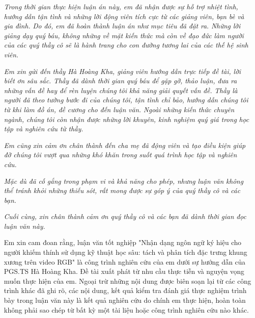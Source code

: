 

\newpage
{}
\thispagestyle{loi_cam_on}
\begin{center}
{}
\end{center}

\textit{Trong thời gian thực hiện luận án này, em đã nhận được sự hỗ trợ nhiệt tình, hướng dẫn tận tình và những lời động viên tích cực từ các giảng viên, bạn bè và gia đình. Do đó, em đã hoàn thành luận án như mục tiêu đã đặt ra. Những lời giảng dạy quý báu, không những về mặt kiến thức mà còn về đạo đức làm người của các quý thầy cô sẽ là hành trang cho con đường tương lai của các thế hệ sinh viên.}

\textit{Em xin gửi đến thầy Hà Hoàng Kha, giảng viên hướng dẫn trực tiếp đề tài, lời biết ơn sâu sắc. Thầy đã dành thời gian quý báu để gặp gỡ, thảo luận, đưa ra những vấn đề hay để rèn luyện chúng tôi khả năng giải quyết vấn đề. Thầy là người đã theo tường bước đi của chúng tôi, tận tình chỉ bảo, hướng dẫn chúng tôi từ khi làm đồ án, đề cương cho đến luận văn. Ngoài những kiến thức chuyên ngành, chúng tôi còn nhận được những lời khuyên, kinh nghiệm quý giá trong học tập và nghiên cứu từ thầy.}

\textit{Em cũng xin cảm ơn chân thành đến cha mẹ đã động viên và tạo điều kiện giúp đỡ chúng tôi vượt qua những khó khăn trong suốt quá trình học tập và nghiên cứu.}

\textit{Mặc dù đã cố gắng trong phạm vi và khả năng cho phép, nhưng luận văn không thể tránh khỏi những thiếu sót, rất mong được sự góp ý của quý thầy cô và các bạn.}

\textit{Cuối cùng, xin chân thành cảm ơn quý thầy cô và các bạn đã dành thời gian đọc luận văn này.}


\newpage
{}
\thispagestyle{loi_cam_doan}
\begin{center}
{}
\end{center}

\noindent Em xin cam đoan rằng, luận văn tốt nghiệp "Nhận dạng ngôn ngữ ký hiệu cho người khiếm thính sử dụng kỹ thuật học sâu: tách và phân tích đặc trưng khung xương trên video RGB" là công trình nghiên cứu của em dưới sự hướng dẫn của PGS.TS Hà Hoàng Kha. Đề tài xuất phát từ nhu cầu thực tiễn và nguyện vọng muốn thực hiện của em. Ngoại trừ những nội dung được biên soạn lại từ các công trình khác đã ghi rõ, các nội dung, kết quả kiểm tra đánh giá thực nghiệm trình bày trong luận văn này là kết quả nghiên cứu do chính em thực hiện, hoàn toàn không phải sao chép từ bất kỳ một tài liệu hoặc công trình nghiên cứu nào khác.

